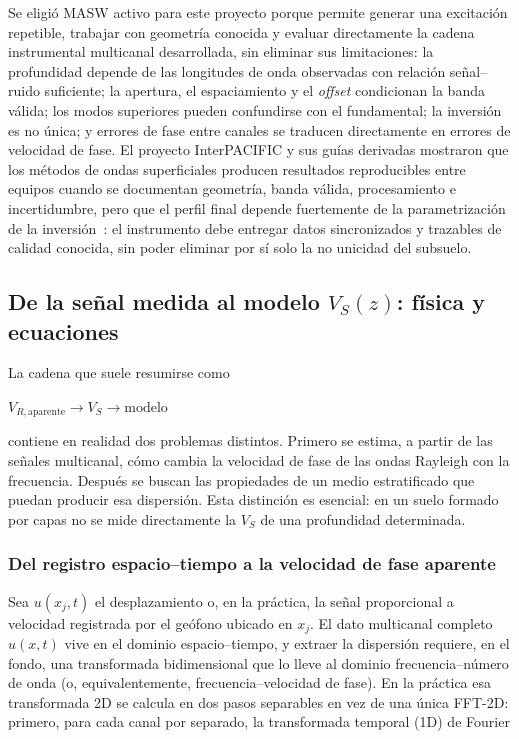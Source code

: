 Se eligió MASW activo para este proyecto porque permite generar una excitación
repetible, trabajar con geometría conocida y evaluar directamente la cadena instrumental
multicanal desarrollada, sin eliminar sus limitaciones: la profundidad depende de las
longitudes de onda observadas con relación señal--ruido suficiente; la apertura, el
espaciamiento y el \emph{offset} condicionan la banda válida; los modos superiores
pueden confundirse con el fundamental; la inversión es no única; y errores de fase entre
canales se traducen directamente en errores de velocidad de fase. El proyecto
InterPACIFIC y sus guías derivadas mostraron que los métodos de ondas superficiales
producen resultados reproducibles entre equipos cuando se documentan geometría, banda
válida, procesamiento e incertidumbre, pero que el perfil final depende fuertemente de
la parametrización de la inversión~\cite{Foti2018}: el instrumento debe entregar datos
sincronizados y trazables de calidad conocida, sin poder eliminar por sí solo la no
unicidad del subsuelo.

\subsection{De la señal medida al modelo \texorpdfstring{$V_S(z)$}{Vs(z)}: física y ecuaciones}

La cadena que suele resumirse como

\begin{center}
$V_{R,\mathrm{aparente}}\longrightarrow V_S\longrightarrow\text{modelo}$
\end{center}

contiene en realidad dos problemas distintos. Primero se estima, a partir de las
señales multicanal, cómo cambia la velocidad de fase de las ondas Rayleigh con la
frecuencia. Después se buscan las propiedades de un medio estratificado que puedan
producir esa dispersión. Esta distinción es esencial: en un suelo formado por capas no
se mide directamente la $V_S$ de una profundidad determinada.

\subsubsection{Del registro espacio--tiempo a la velocidad de fase aparente}

Sea $u(x_j,t)$ el desplazamiento o, en la práctica, la señal proporcional a velocidad
registrada por el geófono ubicado en $x_j$. El dato multicanal completo $u(x,t)$ vive en
el dominio espacio--tiempo, y extraer la dispersión requiere, en el fondo, una
transformada bidimensional que lo lleve al dominio frecuencia--número de onda (o,
equivalentemente, frecuencia--velocidad de fase). En la práctica esa transformada 2D se
calcula en dos pasos separables en vez de una única FFT-2D: primero, para cada canal por
separado, la transformada temporal (1D) de Fourier

